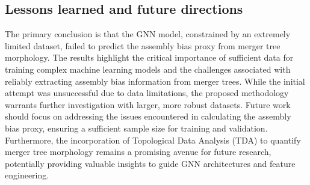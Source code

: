 \documentclass[twocolumn]{aastex631}
\begin{document}
\subsection{Lessons learned and future directions}

The primary conclusion is that the GNN model, constrained by an extremely limited dataset, failed to predict the assembly bias proxy from merger tree morphology. The results highlight the critical importance of sufficient data for training complex machine learning models and the challenges associated with reliably extracting assembly bias information from merger trees. While the initial attempt was unsuccessful due to data limitations, the proposed methodology warrants further investigation with larger, more robust datasets. Future work should focus on addressing the issues encountered in calculating the assembly bias proxy, ensuring a sufficient sample size for training and validation. Furthermore, the incorporation of Topological Data Analysis (TDA) to quantify merger tree morphology remains a promising avenue for future research, potentially providing valuable insights to guide GNN architectures and feature engineering.
\
\end{document}

